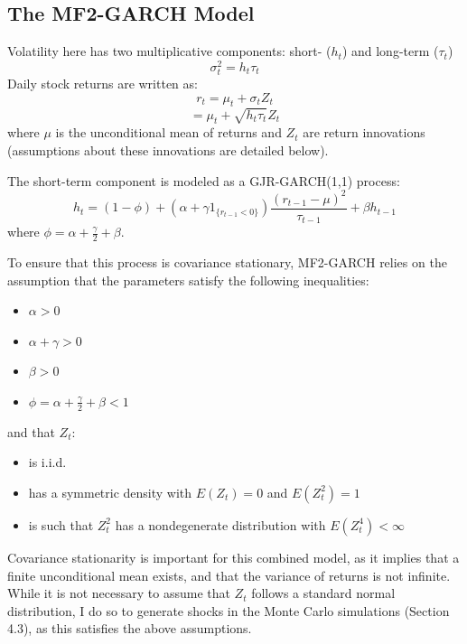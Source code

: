 \documentclass[12pt]{article}
\begin{document}
\subsection{The MF2-GARCH Model}
Volatility here has two multiplicative components: short- ($h_t$) and long-term ($\tau_t$)
\begin{equation}
\nonumber
\sigma_t^2=h_t\tau_t
\end{equation}
Daily stock returns are written as:
\begin{equation}
\nonumber
r_t=\mu_t+\sigma_tZ_t
\end{equation}
\begin{equation}
\nonumber
=\mu_t+\sqrt{h_t\tau_t}Z_t
\end{equation}
where $\mu$ is the unconditional mean of returns and $Z_t$ are return innovations (assumptions about these innovations are detailed below).\par
\vspace{5mm}
\noindent The short-term component is modeled as a GJR-GARCH(1,1) process:
\begin{equation}
h_t=(1-\phi)+(\alpha+\gamma1_{\{r_{t-1}<0\}})\frac{(r_{t-1}-\mu)^2}{\tau_{t-1}}+\beta h_{t-1}
\end{equation}
where $\phi=\alpha+\frac{\gamma}{2}+\beta$.\par
To ensure that this process is covariance stationary, MF2-GARCH relies on the assumption that the parameters satisfy the following inequalities:
\begin{itemize}
\item$\alpha>0$
\item$\alpha+\gamma>0$
\item$\beta>0$
\item$\phi=\alpha+\frac{\gamma}{2}+\beta<1$
\end{itemize}
and that $Z_t$:
\begin{itemize}
\item is i.i.d.
\item has a symmetric density with $E(Z_t)=0$ and $E(Z_t^2)=1$
\item is such that $Z_t^2$ has a nondegenerate distribution with $E(Z_t^4)<\infty$
\end{itemize}
Covariance stationarity is important for this combined model, as it implies that a finite unconditional mean exists, and that the variance of returns is not infinite.
While it is not necessary to assume that $Z_t$ follows a standard normal distribution, I do so to generate shocks in the Monte Carlo simulations (Section 4.3), as this satisfies the above assumptions.\par
\end{document}
